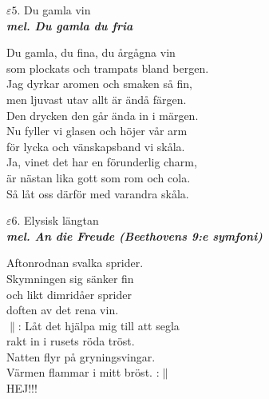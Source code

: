 \documentclass[a6paper,10pt]{article}
\newcommand{\mel}[1]{\small\textbf{\textit{mel. #1 \\}}}
\begin{document}
\setlength{\oddsidemargin}{-0.37in}
\noindent
\begin{center}
\Large $\varepsilon5$. Du gamla vin \\ 
\mel{Du gamla du fria}
\end{center}
Du gamla, du fina, du årgågna vin\\
som plockats och trampats bland bergen.\\
Jag dyrkar aromen och smaken så fin,\\
men ljuvast utav allt är ändå färgen.\\
Den drycken den går ända in i märgen.
\vspace{5pt}\\
Nu fyller vi glasen och höjer vår arm\\
för lycka och vänskapsband vi skåla.\\
Ja, vinet det har en förunderlig charm,\\
är nästan lika gott som rom och cola.\\
Så låt oss därför med varandra skåla.
\vspace{40pt}
\begin{center}
\Large $\varepsilon6$. Elysisk längtan \\ 
\mel{An die Freude (Beethovens 9:e symfoni)}
\end{center}
Aftonrodnan svalka sprider.\\
Skymningen sig sänker fin\\
och likt dimridåer sprider\\
doften av det rena vin.
\vspace{5pt}\\
$\|$: Låt det hjälpa mig till att segla\\
rakt in i rusets röda tröst.\\
Natten flyr på gryningsvingar.\\
Värmen flammar i mitt bröst. :$\|$\\
HEJ!!!
\end{document}

